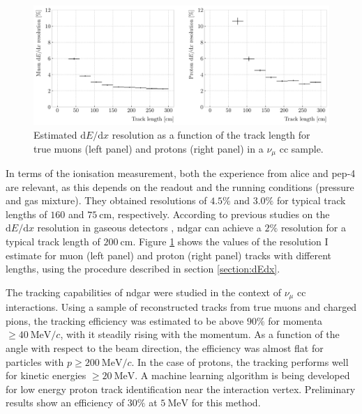 \begin{figure}[t]
    \centering
    \includegraphics[width=.90\linewidth]{Images/GAr_selection/length_dEdx_resolution_vs_length.pdf}
    \caption[Estimated $\mathrm{d}E/\mathrm{d}x$ resolution as a function of the track length for true muons and protons in a $\nu_{\mu}$ \gls{cc} sample.]{Estimated $\mathrm{d}E/\mathrm{d}x$ resolution as a function of the track length for true muons (left panel) and protons (right panel) in a $\nu_{\mu}$ \gls{cc} sample.}
    \label{fig:dEdx_resolution_vs_length}
\end{figure}

In terms of the ionisation measurement, both the experience from \gls{alice} and \gls{pep}-4 are relevant, as this depends on the readout and the running conditions (pressure and gas mixture). They obtained resolutions of $4.5\%$ and $3.0\%$ for typical track lengths of $160$ and $75~\mathrm{cm}$, respectively. According to previous studies on the $\mathrm{d}E/\mathrm{d}x$ resolution in gaseous detectors \cite{Lehraus1983}, \gls{ndgar} can achieve a $2\%$ resolution for a typical track length of $200~\mathrm{cm}$. Figure \ref{fig:dEdx_resolution_vs_length} shows the values of the resolution I estimate for muon (left panel) and proton (right panel) tracks with different lengths, using the procedure described in section \ref{section:dEdx}.

The tracking capabilities of \gls{ndgar} were studied in the context of $\nu_{\mu}$ \gls{cc} interactions. Using a sample of reconstructed tracks from true muons and charged pions, the tracking efficiency was estimated to be above $90\%$ for momenta $\geq 40 ~ \mathrm{MeV}/c$, with it steadily rising with the momentum. As a function of the angle with respect to the beam direction, the efficiency was almost flat for particles with $p\geq 200 ~ \mathrm{MeV}/c$. In the case of protons, the tracking performs well for kinetic energies $\geq 20 ~ \mathrm{MeV}$. A machine learning algorithm is being developed for low energy proton track identification near the interaction vertex. Preliminary results show an efficiency of $30\%$ at $5 ~ \mathrm{MeV}$ for this method.

